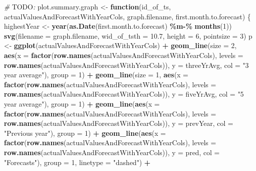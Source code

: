 \documentclass[
]{article}
\newenvironment{Shaded}{\begin{snugshade}}{\end{snugshade}}
\newcommand{\AlertTok}[1]{\textcolor[rgb]{0.94,0.16,0.16}{#1}}
\newcommand{\AttributeTok}[1]{\textcolor[rgb]{0.13,0.29,0.53}{#1}}
\newcommand{\CommentTok}[1]{\textcolor[rgb]{0.56,0.35,0.01}{\textit{#1}}}
\newcommand{\ControlFlowTok}[1]{\textcolor[rgb]{0.13,0.29,0.53}{\textbf{#1}}}
\newcommand{\DecValTok}[1]{\textcolor[rgb]{0.00,0.00,0.81}{#1}}
\newcommand{\FloatTok}[1]{\textcolor[rgb]{0.00,0.00,0.81}{#1}}
\newcommand{\FunctionTok}[1]{\textcolor[rgb]{0.13,0.29,0.53}{\textbf{#1}}}
\newcommand{\NormalTok}[1]{#1}
\newcommand{\OtherTok}[1]{\textcolor[rgb]{0.56,0.35,0.01}{#1}}
\newcommand{\SpecialCharTok}[1]{\textcolor[rgb]{0.81,0.36,0.00}{\textbf{#1}}}
\newcommand{\StringTok}[1]{\textcolor[rgb]{0.31,0.60,0.02}{#1}}
\begin{document}
\begin{Shaded}
\begin{Highlighting}[]
\CommentTok{\# }\AlertTok{TODO}\CommentTok{:}
\NormalTok{plot.summary.graph }\OtherTok{\textless{}{-}} \ControlFlowTok{function}\NormalTok{(id\_of\_ts, actualValuesAndForecastWithYearCols, graph.filename, first.month.to.forecast) \{}
\NormalTok{  highestYear }\OtherTok{\textless{}{-}} \FunctionTok{year}\NormalTok{(}\FunctionTok{as.Date}\NormalTok{(first.month.to.forecast) }\SpecialCharTok{\%m{-}\%} \FunctionTok{months}\NormalTok{(}\DecValTok{1}\NormalTok{))}
  \FunctionTok{svg}\NormalTok{(}\AttributeTok{filename =}\NormalTok{ graph.filename, }\AttributeTok{wid\_of\_tsth =} \FloatTok{10.7}\NormalTok{, }\AttributeTok{height =} \DecValTok{6}\NormalTok{, }\AttributeTok{pointsize =} \DecValTok{3}\NormalTok{)}
\NormalTok{  p }\OtherTok{\textless{}{-}} \FunctionTok{ggplot}\NormalTok{(actualValuesAndForecastWithYearCols) }\SpecialCharTok{+}
    \FunctionTok{geom\_line}\NormalTok{(}\AttributeTok{size =} \DecValTok{2}\NormalTok{, }\FunctionTok{aes}\NormalTok{(}\AttributeTok{x =} \FunctionTok{factor}\NormalTok{(}\FunctionTok{row.names}\NormalTok{(actualValuesAndForecastWithYearCols), }\AttributeTok{levels =} \FunctionTok{row.names}\NormalTok{(actualValuesAndForecastWithYearCols)), }\AttributeTok{y =}\NormalTok{ threeYrAvg, }\AttributeTok{col =} \StringTok{"3 year average"}\NormalTok{), }\AttributeTok{group =} \DecValTok{1}\NormalTok{) }\SpecialCharTok{+}
    \FunctionTok{geom\_line}\NormalTok{(}\AttributeTok{size =} \DecValTok{1}\NormalTok{, }\FunctionTok{aes}\NormalTok{(}\AttributeTok{x =} \FunctionTok{factor}\NormalTok{(}\FunctionTok{row.names}\NormalTok{(actualValuesAndForecastWithYearCols), }\AttributeTok{levels =} \FunctionTok{row.names}\NormalTok{(actualValuesAndForecastWithYearCols)), }\AttributeTok{y =}\NormalTok{ fiveYrAvg, }\AttributeTok{col =} \StringTok{"5 year average"}\NormalTok{), }\AttributeTok{group =} \DecValTok{1}\NormalTok{) }\SpecialCharTok{+}
    \FunctionTok{geom\_line}\NormalTok{(}\FunctionTok{aes}\NormalTok{(}\AttributeTok{x =} \FunctionTok{factor}\NormalTok{(}\FunctionTok{row.names}\NormalTok{(actualValuesAndForecastWithYearCols), }\AttributeTok{levels =} \FunctionTok{row.names}\NormalTok{(actualValuesAndForecastWithYearCols)), }\AttributeTok{y =}\NormalTok{ prevYear, }\AttributeTok{col =} \StringTok{"Previous year"}\NormalTok{), }\AttributeTok{group =} \DecValTok{1}\NormalTok{) }\SpecialCharTok{+}
    \FunctionTok{geom\_line}\NormalTok{(}\FunctionTok{aes}\NormalTok{(}\AttributeTok{x =} \FunctionTok{factor}\NormalTok{(}\FunctionTok{row.names}\NormalTok{(actualValuesAndForecastWithYearCols), }\AttributeTok{levels =} \FunctionTok{row.names}\NormalTok{(actualValuesAndForecastWithYearCols)), }\AttributeTok{y =}\NormalTok{ pred, }\AttributeTok{col =} \StringTok{"Forecasts"}\NormalTok{), }\AttributeTok{group =} \DecValTok{1}\NormalTok{, }\AttributeTok{linetype =} \StringTok{"dashed"}\NormalTok{) }\SpecialCharTok{+}

\end{Highlighting}
\end{Shaded}
\end{document}
